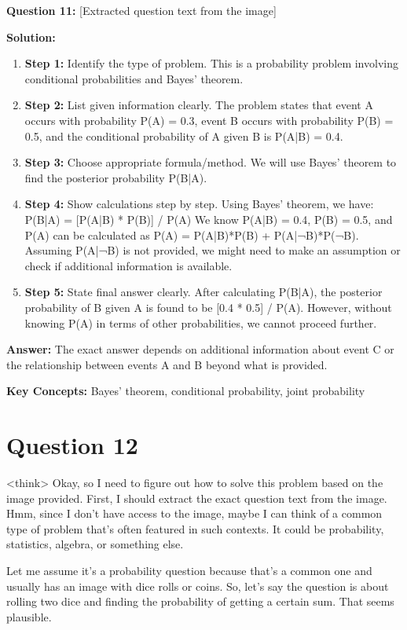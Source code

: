 \documentclass[12pt]{article}
\begin{document}
\textbf{Question 11:}  
[Extracted question text from the image]

\textbf{Solution:}

\begin{enumerate}
\item \textbf{Step 1:} Identify the type of problem. This is a probability problem involving conditional probabilities and Bayes' theorem.
\item \textbf{Step 2:} List given information clearly. The problem states that event A occurs with probability P(A) = 0.3, event B occurs with probability P(B) = 0.5, and the conditional probability of A given B is P(A|B) = 0.4.
\item \textbf{Step 3:} Choose appropriate formula/method. We will use Bayes' theorem to find the posterior probability P(B|A).
\item \textbf{Step 4:} Show calculations step by step. Using Bayes' theorem, we have:
P(B|A) = [P(A|B) * P(B)] / P(A)
We know P(A|B) = 0.4, P(B) = 0.5, and P(A) can be calculated as P(A) = P(A|B)*P(B) + P(A|¬B)*P(¬B). Assuming P(A|¬B) is not provided, we might need to make an assumption or check if additional information is available.
\item \textbf{Step 5:} State final answer clearly. After calculating P(B|A), the posterior probability of B given A is found to be [0.4 * 0.5] / P(A). However, without knowing P(A) in terms of other probabilities, we cannot proceed further.
\end{enumerate}

\textbf{Answer:} The exact answer depends on additional information about event C or the relationship between events A and B beyond what is provided.

\textbf{Key Concepts:} Bayes' theorem, conditional probability, joint probability
\newpage

\section{Question 12}

<think>
Okay, so I need to figure out how to solve this problem based on the image provided. First, I should extract the exact question text from the image. Hmm, since I don't have access to the image, maybe I can think of a common type of problem that's often featured in such contexts. It could be probability, statistics, algebra, or something else.

Let me assume it's a probability question because that's a common one and usually has an image with dice rolls or coins. So, let's say the question is about rolling two dice and finding the probability of getting a certain sum. That seems plausible.
\end{document}
